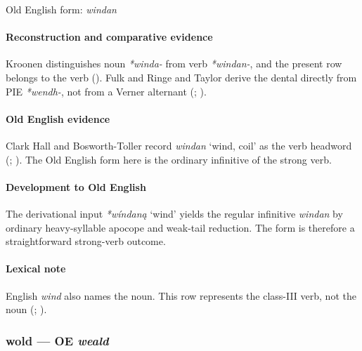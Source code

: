 \documentclass[
  british,
  a4paper,
]{article}
\providecommand{\Recon}[1]{\emph{*#1}}
\begin{document}
Old English form: \emph{windan}

\paragraph{Reconstruction and comparative
evidence}\label{reconstruction-and-comparative-evidence-71}

Kroonen distinguishes noun \emph{*winda-} from verb \emph{*windan-}, and
the present row belongs to the verb (). Fulk and Ringe and Taylor derive the dental directly from PIE
\emph{*wendh-}, not from a Verner alternant
(;
).

\paragraph{Old English evidence}\label{old-english-evidence-71}

Clark Hall and Bosworth-Toller record {\emph{windan}} `wind, coil' as
the verb headword (;
). The
Old English form here is the ordinary infinitive of the strong verb.

\paragraph{Development to Old
English}\label{development-to-old-english-71}

The derivational input \Recon{wíndaną} `wind' yields the regular
infinitive \emph{windan} by ordinary heavy-syllable apocope and
weak-tail reduction. The form is therefore a straightforward strong-verb
outcome.

\paragraph{Lexical note}\label{lexical-note-5}

English \emph{wind} also names the noun. This row represents the
class-III verb, not the noun (;
).

\subsubsection{\texorpdfstring{wold --- OE
\emph{weald}}{wold --- OE weald}}\label{wold-oe-weald}
\end{document}
